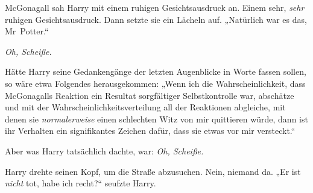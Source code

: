 McGonagall sah Harry mit einem ruhigen Gesichtsausdruck an. Einem sehr, \emph{sehr} ruhigen Gesichtsausdruck. Dann setzte sie ein Lächeln auf.
„Natürlich war es das, Mr~Potter.“

\emph{Oh, Scheiße.}

Hätte Harry seine Gedankengänge der letzten Augenblicke in Worte fassen sollen, so wäre etwa Folgendes herausgekommen:
„Wenn ich die Wahrscheinlichkeit, dass McGonagalls Reaktion ein Resultat sorgfältiger Selbstkontrolle war, abschätze und mit der Wahrscheinlichkeitsverteilung all der Reaktionen abgleiche, mit denen sie \emph{normalerweise} einen schlechten Witz von mir quittieren würde, dann ist ihr Verhalten ein signifikantes Zeichen dafür, dass sie etwas vor mir versteckt.“

Aber was Harry tatsächlich dachte, war: \emph{Oh, Scheiße.}

Harry drehte seinen Kopf, um die Straße abzusuchen. Nein, niemand da.
„Er ist \emph{nicht} tot, habe ich recht?“ seufzte Harry.

